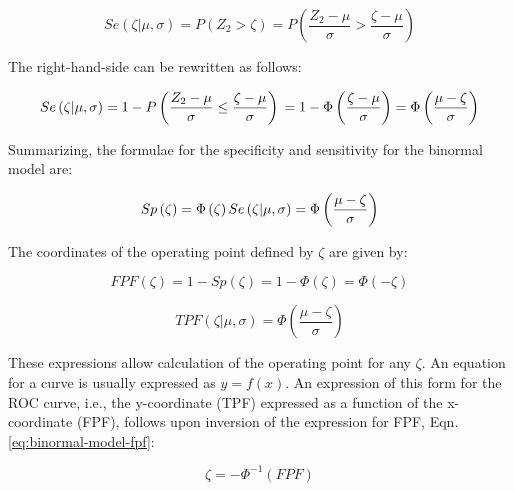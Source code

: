 \documentclass[
]{book}
\begin{document}
\begin{equation} 
Se\left ( \zeta | \mu, \sigma \right )= P\left ( Z_2 > \zeta \right )=P\left ( \frac{Z_2-\mu}{\sigma} > \frac{\zeta-\mu}{\sigma} \right )
\label{eq:binormal-modelSe}
\end{equation}

The right-hand-side can be rewritten as follows:

\begin{equation*} 
Se\left ( \zeta | \mu, \sigma \right )= 1 - P\left ( \frac{Z_2-\mu}{\sigma} \leq  \frac{\zeta-\mu}{\sigma} \right )\\
=1-\Phi\left (  \frac{\zeta-\mu}{\sigma}\right )=\Phi\left (  \frac{\mu-\zeta}{\sigma}\right )
\end{equation*}

Summarizing, the formulae for the specificity and sensitivity for the binormal model are:

\begin{equation} 
Sp\left ( \zeta \right ) = \Phi\left ( \zeta \right )\\
Se\left ( \zeta | \mu, \sigma \right ) = \Phi\left (  \frac{\mu-\zeta}{\sigma}\right )
\label{eq:binormal-modelSeSp}
\end{equation}

The coordinates of the operating point defined by \(\zeta\) are given by:

\begin{equation} 
FPF\left ( \zeta \right ) = 1 - Sp\left ( \zeta \right ) = 1 - \Phi\left ( \zeta \right ) = \Phi\left ( -\zeta \right )
\label{eq:binormal-model-fpf}
\end{equation}

\begin{equation} 
TPF\left ( \zeta | \mu, \sigma \right ) = \Phi\left ( \frac{\mu-\zeta}{\sigma} \right )
\label{eq:binormal-model-tpf}
\end{equation}

These expressions allow calculation of the operating point for any \(\zeta\). An equation for a curve is usually expressed as \(y=f(x)\). An expression of this form for the ROC curve, i.e., the y-coordinate (TPF) expressed as a function of the x-coordinate (FPF), follows upon inversion of the expression for FPF, Eqn. \eqref{eq:binormal-model-fpf}:

\begin{equation} 
\zeta = -\Phi^{-1}\left ( FPF \right )
\label{eq:binormal-modelZeta}
\end{equation}
\end{document}

